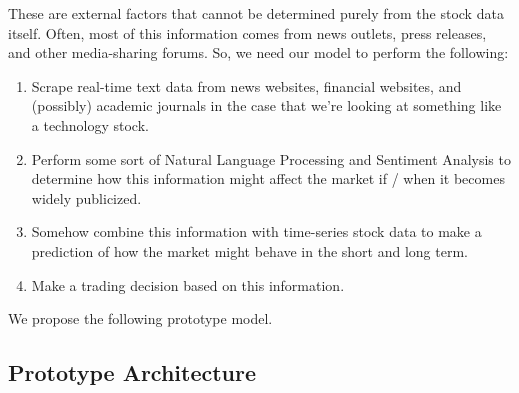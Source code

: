 \documentclass[final]{article}
\begin{document}
These are external factors that cannot be determined purely from the
stock data itself. Often, most of this information comes from news
outlets, press releases, and other media-sharing forums. So, we need
our model to perform the following:
\begin{enumerate}
  \item Scrape real-time text data from news websites, financial
    websites, and (possibly) academic journals in the case that we're
    looking at something like a technology stock.
  \item Perform some sort of Natural Language Processing and Sentiment
    Analysis to determine how this information might affect the market
    if / when it becomes widely publicized.
  \item Somehow combine this information with time-series stock data
    to make a prediction of how the market might behave in the short
    and long term.
  \item Make a trading decision based on this information.
\end{enumerate}
We propose the following prototype model.

\subsection{Prototype Architecture}
\end{document}
